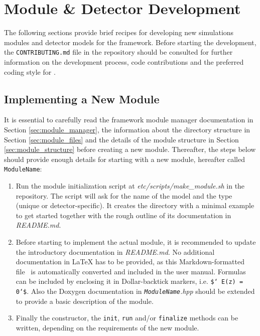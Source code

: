 \section{Module \& Detector Development}

The following sections provide brief recipes for developing new simulations modules and detector models for the \apsq framework.
Before starting the development, the \texttt{CONTRIBUTING.md} file in the repository should be consulted for further information on the development process, code contributions and the preferred coding style for \apsq.

\subsection{Implementing a New Module}
\label{sec:building_new_module}

It is essential to carefully read the framework module manager documentation in Section \ref{sec:module_manager}, the information about the directory structure in Section \ref{sec:module_files} and the details of the module structure in Section \ref{sec:module_structure} before creating a new module.
Thereafter, the steps below should provide enough details for starting with a new module, hereafter called \texttt{ModuleName}:
\begin{enumerate}
\item Run the module initialization script at \textit{etc/scripts/make\_module.sh} in the repository.
The script will ask for the name of the model and the type (unique or detector-specific).
It creates the directory with a minimal example to get started together with the rough outline of its documentation in \textit{README.md}.
\item Before starting to implement the actual module, it is recommended to update the introductory documentation in \textit{README.md}.
No additional documentation in LaTeX has to be provided, as this Markdown-formatted file~\cite{markdown} is automatically converted and included in the user manual.
Formulas can be included by enclosing it in Dollar-backtick markers, i.e. \texttt{\$` E(z) = 0`\$}.
Also the Doxygen documentation in \textit{\texttt{ModuleName}.hpp} should be extended to provide a basic description of the module.
\item Finally the constructor, the \texttt{init}, \texttt{run} and/or \texttt{finalize} methods can be written, depending on the requirements of the new module.
\end{enumerate}

